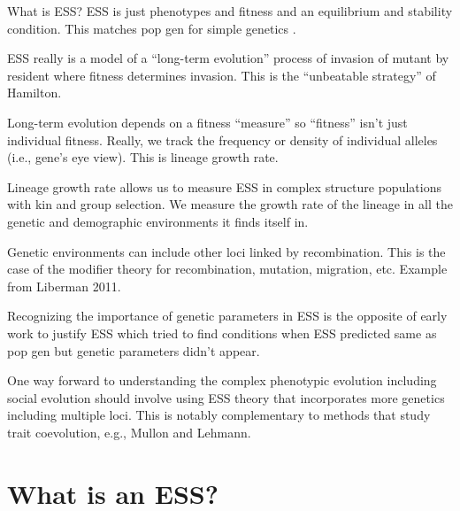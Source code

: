 \documentclass[11pt]{article}
\begin{document}

What is ESS? ESS is just phenotypes and fitness and an equilibrium and stability condition. This matches pop gen for simple genetics \cite{Eshel:1982}.

ESS really is a model of a ``long-term evolution'' process of invasion of mutant by resident where fitness determines invasion. This is the ``unbeatable strategy'' of Hamilton.

Long-term evolution depends on a fitness ``measure'' so ``fitness'' isn't just individual fitness. Really, we track the frequency or density of individual alleles (i.e., gene's eye view). This is lineage growth rate.

Lineage growth rate allows us to measure ESS in complex structure populations with kin and group selection. We measure the growth rate of the lineage in all the genetic and demographic environments it finds itself in.

Genetic environments can include other loci linked by recombination. This is the case of the modifier theory for recombination, mutation, migration, etc. Example from Liberman 2011.

Recognizing the importance of genetic parameters in ESS is the opposite of early work to justify ESS which tried to find conditions when ESS predicted same as pop gen but genetic parameters didn't appear.

One way forward to understanding the complex phenotypic evolution including social evolution should involve using ESS theory that incorporates more genetics including multiple loci. This is notably complementary to methods that study trait coevolution, e.g., Mullon and Lehmann.


\section{What is an ESS?}
\end{document}
